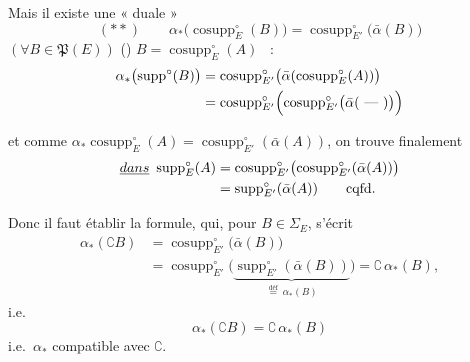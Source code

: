 \documentclass[11pt,a4paper]{article}
\begin{document}
Mais il existe une \ill{}  « duale »
\[ (**) \qquad \alpha_{*}\bigl(\operatorname{cosupp}^{\circ}_{E}(B)\bigr) = \operatorname{cosupp}^{\circ}_{E'}\bigl(\bar\alpha(B)\bigr) \]
\struck{\ill{}} $(\forall B \in \mathfrak{P}(E))$ \ill{}  ()    $B = \operatorname{cosupp}^{\circ}_{E}(A)$ ~:
\begin{align*}
\alpha_{*}\bigl(\operatorname{supp}^{\circ}(B)\bigr) &= \operatorname{cosupp}^{\circ}_{E'}\bigl(\bar\alpha(\operatorname{cosupp}^{\circ}_{E}(A))\bigr) \\
&= \operatorname{cosupp}^{\circ}_{E'}\Bigl(\operatorname{cosupp}^{\circ}_{E'}\bigl(\bar\alpha(\ \text{---}\ )\bigr)\Bigr)
\end{align*}

et comme $\alpha_{*}\operatorname{cosupp}^{\circ}_{E}(A) = \operatorname{cosupp}^{\circ}_{E'}(\bar\alpha(A))$, on trouve finalement
\begin{align*}
\uncertain{dans}\ \operatorname{supp}^{\circ}_{E}(A) &= \operatorname{cosupp}^{\circ}_{E'}\bigl(\operatorname{cosupp}^{\circ}_{E'}(\bar\alpha(A))\bigr) \\
&= \operatorname{supp}^{\circ}_{E'}(\bar\alpha(A)) \qquad \text{cqfd.}
\end{align*}

Donc il faut établir la formule, qui, pour $B \in \Sigma_E$,  s'écrit
\begin{align*}
\alpha_{*}(\complement B) &= \operatorname{cosupp}^{\circ}_{E'}\bigl(\bar\alpha(B)\bigr) \\
&= \operatorname{cosupp}^{\circ}_{E'}\bigl(\underbrace{\operatorname{supp}^{\circ}_{E'}(\bar\alpha(B))}_{\overset{\text{déf}}{=}\ \alpha_{*}(B)}\bigr) = \complement\,\alpha_{*}(B),
\end{align*}
i.e.
\[ \boxed{\ \alpha_{*}(\complement B) = \complement\,\alpha_{*}(B)\ } \]
i.e.\ $\alpha_{*}$ compatible avec $\complement$.
\end{document}
